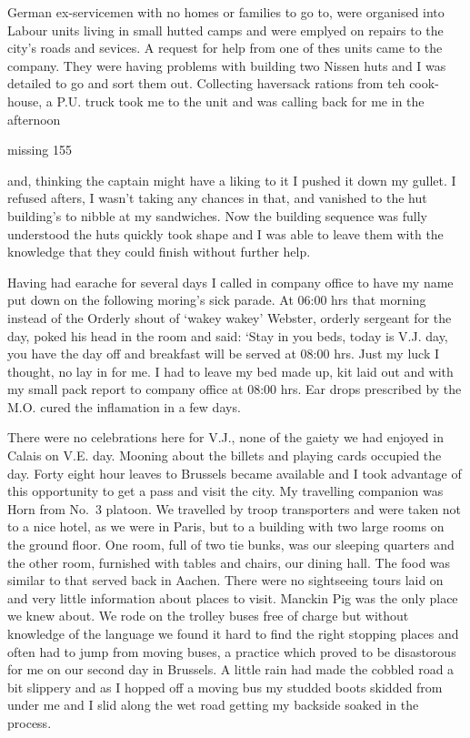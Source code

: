 German ex-servicemen with no homes or families to go to, were
organised into Labour units living in small hutted camps and were
emplyed on repairs to the city's roads and sevices. A request for help
from one of thes units came to the company. They were having problems
with building two Nissen huts and I was detailed to go and sort them
out. Collecting haversack rations from teh cook-house, a P.U. truck
took me to the unit and was calling back for me in the afternoon

missing 155

and, thinking the captain might have a liking to it I pushed it down
my gullet. I refused afters, I wasn't taking any chances in that, and
vanished to the hut building's to nibble at my sandwiches. Now the
building sequence was fully understood the huts quickly took shape and
I was able to leave them with the knowledge that they could finish
without further help.

Having had earache for several days I called in company office to have
my name put down on the following moring's sick parade. At 06:00 hrs
that morning instead of the Orderly shout of `wakey wakey' \sergeant
Webster, orderly sergeant for the day, poked his head in the room and
said: `Stay in you beds, today is V.J. day, you have the day off and
breakfast will be served at 08:00 hrs. Just my luck I thought, no lay
in for me. I had to leave my bed made up, kit laid out and with my small
pack report to company office at 08:00 hrs. Ear drops prescribed by
the M.O. cured the inflamation in a few days.

There were no celebrations here for V.J., none of the gaiety we had
enjoyed in Calais on V.E. day. Mooning about the billets and playing
cards occupied the day. Forty eight hour leaves to Brussels became
available and I took advantage of this opportunity to get a pass and
visit the city. My travelling companion was \sapper Horn from No.~3
platoon. We travelled by troop transporters and were taken not to a
nice hotel, as we were in Paris, but to a building with two large rooms
on the ground floor. One room, full of two tie bunks, was our sleeping
quarters and the other room, furnished with tables and chairs, our
dining hall. The food was similar to that served back in Aachen. There
were no sightseeing tours laid on and very little information about
places to visit. Manckin Pig was the only place we knew about. We rode
on the trolley buses free of charge but without knowledge of the
language we found it hard to find the right stopping places and often
had to jump from moving buses, a practice which proved to be
disastorous for me on our second day in Brussels. A little rain had
made the cobbled road a bit slippery and as I hopped off a moving bus
my studded boots skidded from under me and I slid along the wet road
getting my backside soaked in the process.

